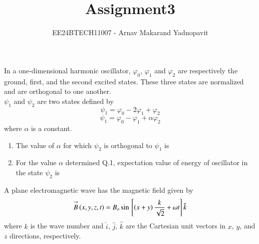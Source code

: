 \documentclass[journal,12pt,onecolumn]{IEEEtran}
\theoremstyle{remark}
\begin{document}
\title{Assignment3}
\author{EE24BTECH11007 - Arnav Makarand Yadnopavit}
\maketitle
\renewcommand{\thefigure}{\theenumi}
\renewcommand{\thetable}{\theenumi}
In a one-dimensional harmonic oscillator, $\varphi_0$, $\varphi_1$ and $\varphi_2$ are respectively the ground, first, and the second excited states. These three states are normalized and are orthogonal to one another.\\
$\psi_1$ and $\psi_2$ are two states defined by
$$\psi_1=\varphi_0-2\varphi_1+\varphi_2$$
$$\psi_1=\varphi_0-\varphi_1+\alpha\varphi_2$$
where $\alpha$ is a constant.
\begin{enumerate}
\item The value of $\alpha$ for which $\psi_2$ is orthogonal to $\psi_1$ is
\begin{enumerate}
\end{enumerate}
\item For the value $\alpha$ determined Q.1, expectation value of energy of oscillator in the state $\psi_2$ is
\begin{enumerate}
\end{enumerate}
\end{enumerate}
A plane electromagnetic wave has the magnetic field given by
$${\overset{\rightarrow}{B}}\left(x,y,z,t\right)=B_o\sin{}\left[\left(x+y\right)\frac{k}{\sqrt{2}}+\omega t\right]\hat{k}$$
where $k$ is the wave number and $\hat{i}$, $\hat{j}$, $\hat{k}$ are the Cartesian unit vectors in $x$, $y$, and $z$ directions, respectively.
\end{document}
